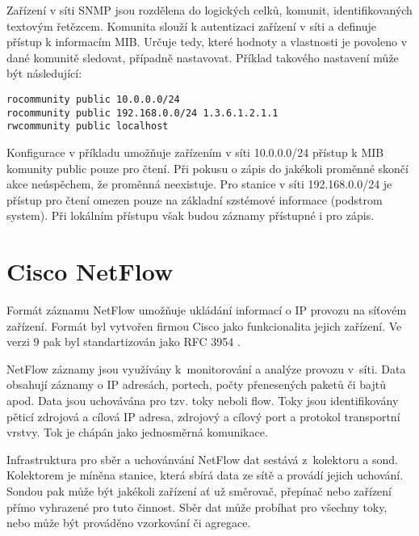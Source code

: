 Zařízení v síti SNMP jsou rozdělena do logických celků, komunit, identifikovaných textovým
 řetězcem. Komunita slouží k autentizaci zařízení v síti a definuje přístup k informacím MIB.
 Určuje tedy, které hodnoty a vlastnosti je povoleno v dané komunitě sledovat, případně nastavovat.
 Příklad takového nastavení může být následující: 
\begin{verbatim}
rocommunity public 10.0.0.0/24
rocommunity public 192.168.0.0/24 1.3.6.1.2.1.1
rwcommunity public localhost
\end{verbatim}
Konfigurace v příkladu umožňuje zařízením v síti 10.0.0.0/24 přístup k MIB komunity public pouze
 pro čtení. Při pokusu o zápis do jakékoli proměnné skončí akce neúspěchem, že proměnná neexistuje.
 Pro stanice v síti 192.168.0.0/24 je přístup pro čtení omezen pouze na základní szstémové informace
 (podstrom system). Při lokálním přístupu však budou záznamy přístupné i pro zápis.

\section{Cisco NetFlow}
Formát záznamu NetFlow umožňuje ukládání informací o IP provozu na síťovém zařízení. Formát byl
 vytvořen firmou Cisco jako funkcionalita jejich zařízení. Ve verzi 9 pak byl standartizován
 jako RFC 3954 \cite{rfc3954}.

NetFlow záznamy jsou využívány k~monitorování a analýze provozu v~síti. Data obsahují záznamy
 o IP adresách, portech, počty přenesených paketů či bajtů apod. Data jsou uchovávána pro
 tzv. toky neboli flow. Toky jsou identifikovány pěticí zdrojová a cílová IP adresa,
 zdrojový a cílový port a protokol transportní vrstvy. Tok je chápán jako jednosměrná komunikace.

Infrastruktura pro sběr a uchovánvání NetFlow dat sestává z~kolektoru a sond. Kolektorem je míněna
 stanice, která sbírá data ze sítě a provádí jejich uchování. Sondou pak může být jakékoli zařízení
 ať už směrovač, přepínač nebo zařízení přímo vyhrazené pro tuto činnost. Sběr dat může probíhat
 pro všechny toky, nebo může být prováděno vzorkování či agregace. 

